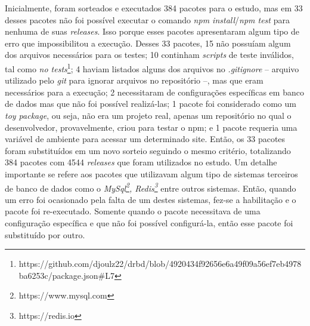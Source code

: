 Inicialmente, foram sorteados e executados 384 pacotes para o estudo, mas em 33 desses pacotes não foi possível executar o comando \textit{npm install}/\textit{npm test} para nenhuma de suas \textit{releases}. Isso porque esses pacotes apresentaram algum tipo de erro que impossibilitou a execução. Desses 33 pacotes, 15 não possuíam algum dos arquivos necessários para os testes; 10 continham \textit{scripts} de teste inválidos, tal como \textit{no tests}\footnote{https://github.com/djoulz22/drbd/blob/4920434f92656e6a49f09a56ef7eb4978ba6253c/package.json\#L7}; 4 haviam listados alguns dos arquivos no \textit{.gitignore} -- arquivo utilizado pelo \textit{git} para ignorar arquivos no repositório --, mas que eram necessários para a execução; 2 necessitaram de configurações específicas em banco de dados mas que não foi possível realizá-las; 1 pacote foi considerado como um \textit{toy package}, ou seja, não era um projeto real, apenas um repositório no qual o desenvolvedor, provavelmente, criou para testar o \gls{npm}; e 1 pacote requeria uma variável de ambiente para acessar um determinado site. Então, os 33 pacotes foram substituídos em um novo sorteio seguindo o mesmo critério, totalizando 384 pacotes com 4544 \textit{releases} que foram utilizados no estudo. Um detalhe importante se refere aos pacotes que utilizavam algum tipo de sistemas terceiros de banco de dados como o \textit{MySql\footnote{https://www.mysql.com}, Redis\footnote{https://redis.io}} entre outros sistemas. Então, quando um erro foi ocasionado pela falta de um destes sistemas, fez-se a habilitação e o pacote foi re-executado. Somente quando o pacote necessitava de uma configuração específica e que não foi possível configurá-la, então esse pacote foi substituído por outro.


